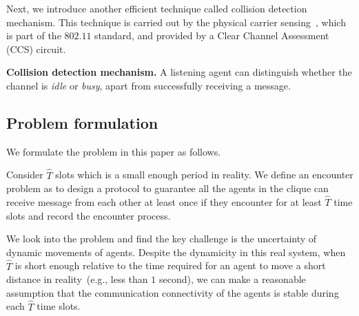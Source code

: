 



 

Next, we introduce another efficient technique called collision detection mechanism.
This technique is carried out by the physical carrier sensing~\cite{Yang2005On}, which is part of 
the $802.11$ standard, and provided by a Clear Channel Assessment (CCS) circuit.

\textbf{Collision detection mechanism.}
A listening agent can distinguish whether the channel is \emph{idle} or \emph{busy}, 
apart from successfully receiving a message. 

\subsection{Problem formulation}

We formulate the problem in this paper as follows.
\begin{problem}
    Consider $\hat{T}$ slots which is a small enough period in reality.
    We define an encounter problem as to design a protocol to guarantee 
    all the agents in the clique can receive message from each other at least once 
    if they encounter for at least $\hat{T}$ time slots and record the encounter process. 
\end{problem}


We look into the problem and find the key challenge is 
the uncertainty of dynamic movements
of agents. Despite the dynamicity in this real system, 
when $\hat{T}$ is short enough relative to 
the time required for an agent to move a short distance
in reality~(e.g., less than $1$ second),
we can make a reasonable assumption that the communication 
connectivity of the agents is stable during each $\hat{T}$ time slots. 

